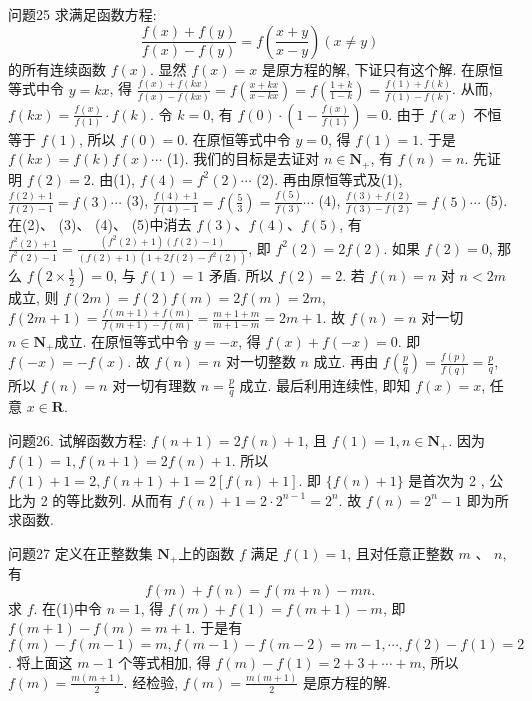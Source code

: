 问题25 求满足函数方程:
$$
\frac{f(x)+f(y)}{f(x)-f(y)}=f\left(\frac{x+y}{x-y}\right)(x \neq y)
$$
的所有连续函数 $f(x)$.
显然 $f(x)=x$ 是原方程的解, 下证只有这个解.
在原恒等式中令 $y=k x$, 得 $\frac{f(x)+f(k x)}{f(x)-f(k x)}=f\left(\frac{x+k x}{x-k x}\right)=f\left(\frac{1+k}{1-k}\right)=\frac{f(1)+f(k)}{f(1)-f(k)}$. 
从而, $f(k x)=\frac{f(x)}{f(1)} \cdot f(k)$. 令 $k=0$, 有 $f(0) \cdot\left(1-\frac{f(x)}{f(1)}\right)=0$. 
由于 $f(x)$ 不恒等于 $f(1)$, 所以 $f(0)=0$. 在原恒等式中令 $y=0$, 得 $f(1)=1$. 于是 $f(k x)=f(k) f(x) \cdots$ (1). 
我们的目标是去证对 $n \in \mathbf{N}_{+}$, 有 $f(n)=n$. 先证明 $f(2)=2$. 
由(1), $f(4)=f^2(2) \cdots$ (2). 再由原恒等式及(1), $\frac{f(2)+1}{f(2)-1}=f(3) \cdots$ (3), $\frac{f(4)+1}{f(4)-1}=f\left(\frac{5}{3}\right)=\frac{f(5)}{f(3)} \cdots$ (4), $\frac{f(3)+f(2)}{f(3)-f(2)}=f(5) \cdots$ (5). 
在(2)、 (3)、 (4)、 (5)中消去 $f(3) 、 f(4) 、 f(5)$, 有 $\frac{f^2(2)+1}{f^2(2)-1}=\frac{\left(f^2(2)+1\right)(f(2)-1)}{(f(2)+1)\left(1+2 f(2)-f^2(2)\right)}$,
即 $f^2(2)=2 f(2)$. 如果 $f(2)=0$, 那么 $f\left(2 \times \frac{1}{2}\right)=0$, 与 $f(1)=1$ 矛盾.
所以 $f(2)=2$. 若 $f(n)=n$ 对 $n<2 m$ 成立, 则 $f(2 m)=f(2) f(m)=2 f(m)=2 m$, $f(2 m+1)=\frac{f(m+1)+f(m)}{f(m+1)-f(m)}=\frac{m+1+m}{m+1-m}=2 m+1$. 
故 $f(n)=n$ 对一切 $n \in \mathbf{N}_{+}$成立.
在原恒等式中令 $y=-x$, 得 $f(x)+f(-x)=0$. 即 $f(-x)= -f(x)$. 故 $f(n)=n$ 对一切整数 $n$ 成立.
再由 $f\left(\frac{p}{q}\right)=\frac{f(p)}{f(q)}=\frac{p}{q}$, 所以 $f(n)=n$ 对一切有理数 $n=\frac{p}{q}$ 成立.
最后利用连续性, 即知 $f(x)=x$, 任意 $x \in \mathbf{R}$.



问题26. 试解函数方程: $f(n+1)=2 f(n)+1$, 且 $f(1)=1, n \in \mathbf{N}_{+}$.
因为 $f(1)=1, f(n+1)=2 f(n)+1$. 所以 $f(1)+1=2, f(n+ 1)+1=2[f(n)+1]$. 即 $\{f(n)+1\}$ 是首次为 2 , 公比为 2 的等比数列.
从而有 $f(n)+1=2 \cdot 2^{n-1}=2^n$. 故 $f(n)=2^n-1$ 即为所求函数.



问题27 定义在正整数集 $\mathbf{N}_{+}$上的函数 $f$ 满足 $f(1)=1$, 且对任意正整数 $m$ 、 $n$, 有
$$
f(m)+f(n)=f(m+n)-m n .
$$
求 $f$.
在(1)中令 $n=1$, 得 $f(m)+f(1)=f(m+1)-m$, 即 $f(m+1)- f(m)=m+1$. 于是有 $f(m)-f(m-1)=m, f(m-1)-f(m-2)=m- 1, \cdots, f(2)-f(1)=2$. 将上面这 $m-1$ 个等式相加, 得 $f(m)-f(1)=2+ 3+\cdots+m$, 所以 $f(m)=\frac{m(m+1)}{2}$. 经检验, $f(m)=\frac{m(m+1)}{2}$ 是原方程的解.



